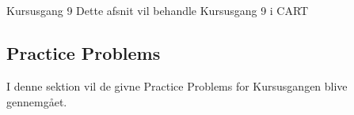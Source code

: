 \chapter{}{Kursusgang 9}
Dette afsnit vil behandle Kursusgang 9 i CART

\section{Practice Problems}
I denne sektion vil de givne Practice Problems for Kursusgangen blive gennemgået.
